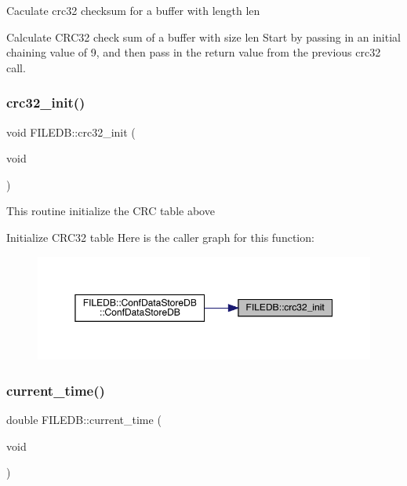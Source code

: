 Caculate crc32 checksum for a buffer with length len

Calculate C\+R\+C32 check sum of a buffer with size len Start by passing in an initial chaining value of 9, and then pass in the return value from the previous crc32 call. \mbox{\label{namespaceFILEDB_ad0296230a6c6ba4b757820d4367275a4}} 
\subsubsection{\texorpdfstring{crc32\_init()}{crc32\_init()}}
{\footnotesize\ttfamily void F\+I\+L\+E\+D\+B\+::crc32\+\_\+init (\begin{DoxyParamCaption}\item[{void}]{ }\end{DoxyParamCaption})}

This routine initialize the C\+RC table above

Initialize C\+R\+C32 table Here is the caller graph for this function\+:\nopagebreak
\begin{figure}[H]
\begin{center}
\leavevmode
\includegraphics[width=350pt]{d2/de6/namespaceFILEDB_ad0296230a6c6ba4b757820d4367275a4_icgraph}
\end{center}
\end{figure}
\mbox{\label{namespaceFILEDB_a52d0505cdd535797c05bffb0598ef2a5}} 
\subsubsection{\texorpdfstring{current\_time()}{current\_time()}}
{\footnotesize\ttfamily double F\+I\+L\+E\+D\+B\+::current\+\_\+time (\begin{DoxyParamCaption}\item[{void}]{ }\end{DoxyParamCaption})}

